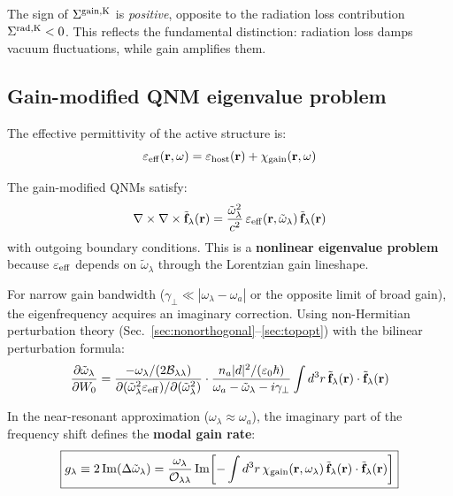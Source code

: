 \documentclass[12pt]{article}
\newcommand{\tf}{\tilde{\mathbf{f}}}
\newcommand{\tomega}{\tilde{\omega}}
\begin{document}
The sign of $\Sigma^{\rm gain,K}$ is \emph{positive}, opposite to the
radiation loss contribution $\Sigma^{\rm rad,K} < 0$.  This reflects the
fundamental distinction: radiation loss damps vacuum fluctuations, while
gain amplifies them.

\subsection{Gain-modified QNM eigenvalue problem}
\label{sec:gain_QNM}

The effective permittivity of the active structure is:
\begin{equation}
  \varepsilon_{\rm eff}(\mathbf{r},\omega) =
  \varepsilon_{\rm host}(\mathbf{r})
  + \chi_{\rm gain}(\mathbf{r},\omega)
  \label{eq:eps_eff_gain}
\end{equation}

The gain-modified QNMs satisfy:
\begin{equation}
  \nabla\times\nabla\times\tf_\lambda(\mathbf{r}) =
  \frac{\tomega_\lambda^2}{c^2}\,
  \varepsilon_{\rm eff}(\mathbf{r},\tomega_\lambda)\,\tf_\lambda(\mathbf{r})
  \label{eq:gain_QNM_eigen}
\end{equation}
with outgoing boundary conditions.  This is a \textbf{nonlinear eigenvalue
problem} because $\varepsilon_{\rm eff}$ depends on $\tomega_\lambda$
through the Lorentzian gain lineshape.

For narrow gain bandwidth ($\gamma_\perp\ll|\omega_\lambda - \omega_a|$
or the opposite limit of broad gain), the eigenfrequency acquires an
imaginary correction.  Using non-Hermitian perturbation theory
(Sec.~\ref{sec:nonorthogonal}--\ref{sec:topopt}) with the bilinear
perturbation formula:
\begin{equation}
  \frac{\partial\tomega_\lambda}{\partial W_0} =
  \frac{-\omega_\lambda/(2\mathcal{B}_{\lambda\lambda})}
  {\partial(\tomega_\lambda^2\varepsilon_{\rm eff})/\partial(\tomega_\lambda^2)}
  \cdot\frac{n_a|d|^2/(\varepsilon_0\hbar)}
  {\omega_a-\tomega_\lambda-i\gamma_\perp}
  \int d^3r\,\tf_\lambda(\mathbf{r})\cdot\tf_\lambda(\mathbf{r})
  \label{eq:gain_pert}
\end{equation}

In the near-resonant approximation ($\omega_\lambda\approx\omega_a$), the
imaginary part of the frequency shift defines the \textbf{modal gain rate}:
\begin{equation}
  \boxed{
  g_\lambda \equiv 2\,\mathrm{Im}(\Delta\tomega_\lambda) =
  \frac{\omega_\lambda}{\mathcal{O}_{\lambda\lambda}}
  \,\mathrm{Im}\!\left[-\int d^3r\,\chi_{\rm gain}(\mathbf{r},\omega_\lambda)\,
  \tf_\lambda(\mathbf{r})\cdot\tf_\lambda(\mathbf{r})\right]
  }
  \label{eq:modal_gain}
\end{equation}
\end{document}
